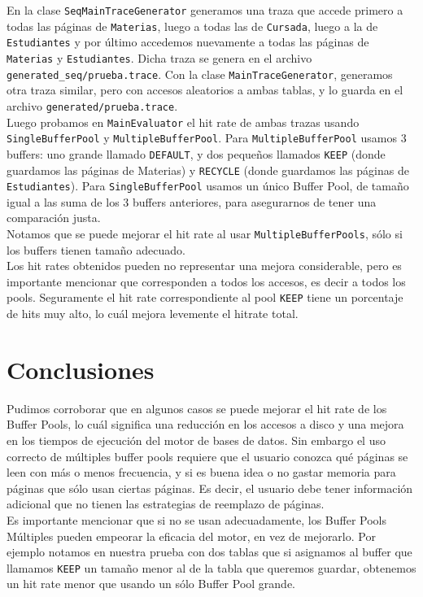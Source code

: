 \documentclass[a4paper,10pt]{article}
\begin{document}
En la clase \texttt{SeqMainTraceGenerator} generamos una traza que accede primero a todas las p\'aginas de \texttt{Materias}, luego a todas las de \texttt{Cursada}, luego a la de \texttt{Estudiantes} y por \'ultimo accedemos nuevamente a todas las p\'aginas de \texttt{Materias} y \texttt{Estudiantes}. Dicha traza se genera en el archivo \texttt{generated\_seq/prueba.trace}.
Con la clase \texttt{MainTraceGenerator}, generamos otra traza similar, pero con accesos aleatorios a ambas tablas, y lo guarda en el archivo \texttt{generated/prueba.trace}.\\


Luego probamos en \texttt{MainEvaluator} el hit rate de ambas trazas usando \texttt{SingleBufferPool} y \texttt{MultipleBufferPool}. Para \texttt{MultipleBufferPool} usamos 3 buffers: uno grande llamado \texttt{DEFAULT}, y dos peque\~nos llamados \texttt{KEEP} (donde guardamos las p\'aginas de Materias) y \texttt{RECYCLE} (donde guardamos las p\'aginas de \texttt{Estudiantes}). Para \texttt{SingleBufferPool} usamos un \'unico Buffer Pool, de tama\~no igual a las suma de los 3 buffers anteriores, para asegurarnos de tener una comparaci\'on justa.\\

Notamos que se puede mejorar el hit rate al usar \texttt{MultipleBufferPools}, s\'olo si los buffers tienen tama\~no adecuado.\\


Los hit rates obtenidos pueden no representar una mejora considerable, pero es importante mencionar que corresponden a todos los accesos, es decir a todos los pools. Seguramente el hit rate correspondiente al pool \texttt{KEEP} tiene un porcentaje de hits muy alto, lo cu\'al mejora levemente el hitrate total.

\section{Conclusiones}

Pudimos corroborar que en algunos casos se puede mejorar el hit rate de los Buffer Pools, lo cu\'al significa una reducci\'on en los accesos a disco y una mejora en los tiempos de ejecución del motor de bases de datos. Sin embargo el uso correcto de m\'ultiples buffer pools requiere que el usuario conozca qu\'e p\'aginas se leen con m\'as o menos frecuencia, y si es buena idea o no gastar memoria para p\'aginas que s\'olo usan ciertas p\'aginas. Es decir, el usuario debe tener informaci\'on adicional que no tienen las estrategias de reemplazo de p\'aginas.\\

Es importante mencionar que si no se usan adecuadamente, los Buffer Pools M\'ultiples pueden empeorar la eficacia del motor, en vez de mejorarlo. Por ejemplo notamos en nuestra prueba con dos tablas que si asignamos al buffer que llamamos \texttt{KEEP} un tama\~no menor al de la tabla que queremos guardar, obtenemos un hit rate menor que usando un s\'olo Buffer Pool grande.

\end{document}
